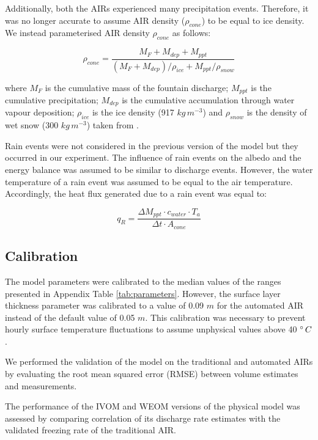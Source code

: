 \documentclass[tc, manuscript]{copernicus}
\begin{document}
Additionally, both the AIRs experienced many precipitation events. Therefore, it was no longer accurate to
assume AIR density ($\rho_{cone}$) to be equal to ice density. We instead parameterised AIR density $\rho_{cone}$ as follows:

\begin{equation}
  \rho_{cone} = \frac{M_{F} + M_{dep} + M_{ppt}}{(M_{F} + M_{dep})/\rho_{ice} + M_{ppt}/\rho_{snow}}
\end{equation}

where $M_F$ is the cumulative mass of the fountain discharge; $M_{ppt}$ is the cumulative precipitation;
$M_{dep}$ is the cumulative accumulation through water vapour deposition; $\rho_{ice}$ is the ice density (917
$kg\,m^{-3}$) and $\rho_{snow}$ is the density of wet snow (300 $kg\,m^{-3}$) taken from
\cite{cuffeyPhysicsGlaciers2010} .

Rain events were not considered in the previous version of the model but they occurred in our experiment. The
influence of rain events on the albedo and the energy balance was assumed to be similar to discharge
events. However, the water temperature of a rain event was assumed to be equal to the air temperature.
Accordingly, the heat flux generated due to a rain event was equal to:

\begin{equation}
  q_{R} = \frac{\Delta M_{ppt} \cdot c_{water} \cdot T_{a}}{\Delta t \cdot A_{cone}}
\end{equation}

\subsection{Calibration}

The model parameters were calibrated to the median values of the ranges presented in Appendix Table
\ref{tab:parameters}. However, the surface layer thickness parameter was calibrated to a value of 0.09 $m$ for the
automated AIR instead of the default value of 0.05 $m$. This calibration was necessary to prevent hourly surface
temperature fluctuations to assume unphysical values above 40 $^{\circ}\,C$.

We performed the validation of the model on the traditional and automated AIRs by evaluating the root mean
squared error (RMSE) between volume estimates and measurements. 

The performance of the IVOM and WEOM versions of the physical model was assessed by comparing correlation of its
discharge rate estimates with the validated freezing rate of the traditional AIR.
\end{document}
